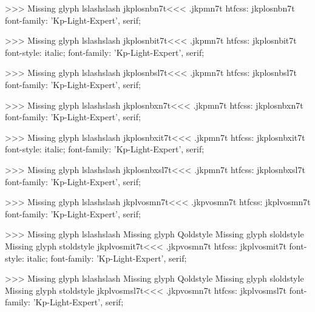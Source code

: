 >>>
Missing glyph	lslashslash
\<jkplosnbn7t\><<<
.jkpmn7t
htfcss:  jkplosnbn7t  font-family: 'Kp-Light-Expert', serif;

>>>
Missing glyph	lslashslash
\<jkplosnbit7t\><<<
.jkpmn7t
htfcss:  jkplosnbit7t  font-style: italic; font-family: 'Kp-Light-Expert', serif;

>>>
Missing glyph	lslashslash
\<jkplosnbsl7t\><<<
.jkpmn7t
htfcss:  jkplosnbsl7t  font-family: 'Kp-Light-Expert', serif;

>>>
Missing glyph	lslashslash
\<jkplosnbxn7t\><<<
.jkpmn7t
htfcss:  jkplosnbxn7t  font-family: 'Kp-Light-Expert', serif;

>>>
Missing glyph	lslashslash
\<jkplosnbxit7t\><<<
.jkpmn7t
htfcss:  jkplosnbxit7t  font-style: italic; font-family: 'Kp-Light-Expert', serif;

>>>
Missing glyph	lslashslash
\<jkplosnbxsl7t\><<<
.jkpmn7t
htfcss:  jkplosnbxsl7t  font-family: 'Kp-Light-Expert', serif;

>>>
Missing glyph	lslashslash
\<jkplvosmn7t\><<<
.jkpvosmn7t
htfcss:  jkplvosmn7t  font-family: 'Kp-Light-Expert', serif;

>>>
Missing glyph	lslashslash
Missing glyph	Qoldstyle
Missing glyph	sloldstyle
Missing glyph	stoldstyle
\<jkplvosmit7t\><<<
.jkpvosmn7t
htfcss:  jkplvosmit7t  font-style: italic; font-family: 'Kp-Light-Expert', serif;

>>>
Missing glyph	lslashslash
Missing glyph	Qoldstyle
Missing glyph	sloldstyle
Missing glyph	stoldstyle
\<jkplvosmsl7t\><<<
.jkpvosmn7t
htfcss:  jkplvosmsl7t  font-family: 'Kp-Light-Expert', serif;

